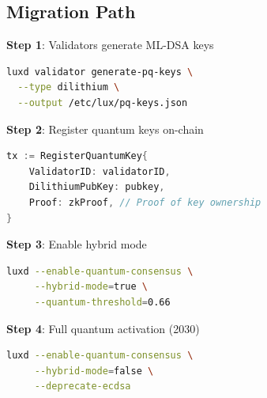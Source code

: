 \subsection{Migration Path}

\textbf{Step 1}: Validators generate ML-DSA keys
\begin{lstlisting}[language=bash]
luxd validator generate-pq-keys \
  --type dilithium \
  --output /etc/lux/pq-keys.json
\end{lstlisting}

\textbf{Step 2}: Register quantum keys on-chain
\begin{lstlisting}[language=Go]
tx := RegisterQuantumKey{
    ValidatorID: validatorID,
    DilithiumPubKey: pubkey,
    Proof: zkProof, // Proof of key ownership
}
\end{lstlisting}

\textbf{Step 3}: Enable hybrid mode
\begin{lstlisting}[language=bash]
luxd --enable-quantum-consensus \
     --hybrid-mode=true \
     --quantum-threshold=0.66
\end{lstlisting}

\textbf{Step 4}: Full quantum activation (2030)
\begin{lstlisting}[language=bash]
luxd --enable-quantum-consensus \
     --hybrid-mode=false \
     --deprecate-ecdsa
\end{lstlisting}

